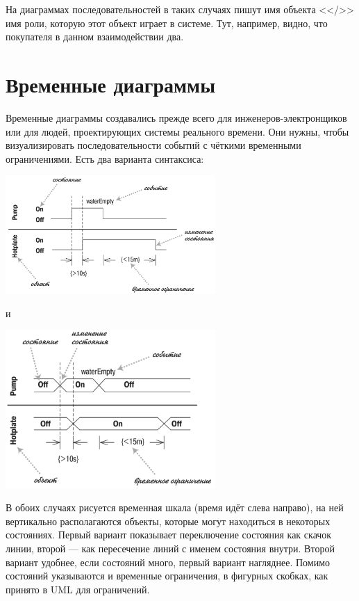 \documentclass{../mcstext}
\begin{document}
На диаграммах последовательностей в таких случаях пишут имя объекта <</>> имя роли, которую этот объект играет в системе. Тут, например, видно, что покупателя в данном взаимодействии два.

\section{Временные диаграммы}

Временные диаграммы создавались прежде всего для инженеров-электронщиков или для людей, проектирующих системы реального времени. Они нужны, чтобы визуализировать последовательности событий с чёткими временными ограничениями. Есть два варианта синтаксиса:

\begin{center}
    \includegraphics[width=0.6\textwidth]{timingDiagrams.png}
\end{center}

и

\begin{center}
    \includegraphics[width=0.6\textwidth]{timingDiagramsAlternate.png}
\end{center}

В обоих случаях рисуется временная шкала (время идёт слева направо), на ней вертикально располагаются объекты, которые могут находиться в некоторых состояниях. Первый вариант показывает переключение состояния как скачок линии, второй --- как пересечение линий с именем состояния внутри. Второй вариант удобнее, если состояний много, первый вариант нагляднее. Помимо состояний указываются и временные ограничения, в фигурных скобках, как принято в UML для ограничений.
\end{document}
